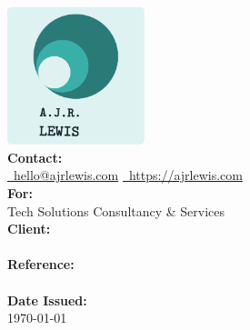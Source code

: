 \documentclass{article}
\begin{document}
    \begin{center}
        \includegraphics[width=4cm]{images/logo.png}\\
        \vspace{0.25cm}
        \textbf{Contact:}\\
        \href{mailto:hello@ajrlewis.com}{\Letter~hello@ajrlewis.com}\quad
        \href{https://www.ajrlewis.com}{\Mundus~https://ajrlewis.com} \\
        \vspace{0.75cm}
        \large
        \textbf{        
        For:
        }\\
        Tech Solutions Consultancy \& Services\\
        \vspace{0.5cm}
        \textbf{Client:}\\
        \\
        \vspace{0.5cm}
        \textbf{Reference:}\\
        \\
        \vspace{0.5cm}
        \textbf{Date Issued:}\\
        \today\\
        \vspace{0.75cm}
    \end{center}

    \noindent
    \vspace{0.25cm}

\end{document}
